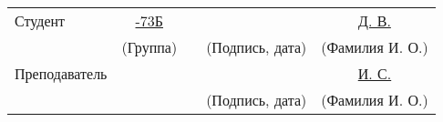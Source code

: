 \noindent
\begin{center}
\begin{tabular}{p{} p{} p{} p{} p{}} 
    Студент       & \multicolumn{1}{c}{\uline{7-73Б\hfill}} & & \uline{\hfill}                           & \multicolumn{1}{c}{\uline{ Д. В.\hfill}}   \\
                  & \multicolumn{1}{c}{\tiny(Группа)}               & & \multicolumn{1}{c}{\tiny(Подпись, дата)} & \multicolumn{1}{c}{\tiny(Фамилия И. О.)}                \\
    Преподаватель &                                                 & & \uline{\hfill}                           & \multicolumn{1}{c}{\uline{ И. С.\hfill}}   \\
                  &                                                 & & \multicolumn{1}{c}{\tiny(Подпись, дата)} & \multicolumn{1}{c}{\tiny(Фамилия И. О.)}                \\
\end{tabular}
\end{center}


\pagebreak


